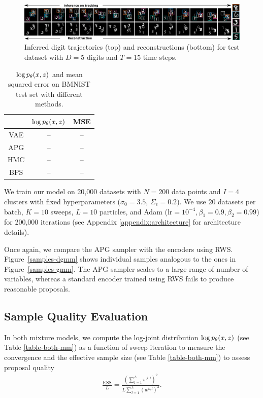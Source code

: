\documentclass{article}
\theoremstyle{definition}
\begin{document}
\begin{figure}[!h]
  \centering
  \includegraphics[width=1.0\textwidth]{figures/bmnist-5digits-samples.pdf}
  \caption{Inferred digit trajectories (top) and reconstructions (bottom) for test dataset with $D = 5$ digits and $T = 15$ time steps.}
  \label{mnist-qualitative}
\end{figure}
\begin{table}[t!]
    \centering
    \caption{$\log p_\theta (x, z)$ and mean squared error on BMNIST test set with different methods.}
    \begin{tabular}{ccc}
     
    \toprule
         & $\log p_\theta (x, z)$ & MSE \\
    \midrule
        VAE & -- & -- \\
        APG & -- & -- \\
        HMC & -- & -- \\
        BPS & -- & -- \\
    \bottomrule
    \end{tabular}   
\end{table}
We train our model on 20,000 datasets with $N = 200$ data points and $I = 4$ clusters with fixed hyperparameters ($\sigma_0 = 3.5$, $\Sigma_{\epsilon} = 0.2$). We use $20$ datasets per batch, $K=10$ sweeps, $L=10$ particles, and Adam ($\mathrm{lr} = 10^{-4}, \beta_1 = 0.9, \beta_2 = 0.99$) for 200,000 iterations (see Appendix \ref{appendix:architecture} for architecture details).

Once again, we compare the APG sampler with the encoders using RWS. Figure~\ref{samples-dgmm} shows individual samples analogous to the ones in Figure~\ref{samples-gmm}. The APG sampler scales to a large range of number of variables, whereas a standard encoder trained using RWS fails to produce reasonable proposals.

\subsection{Sample Quality Evaluation}
In both mixture models, we compute the log-joint distribution $\log p_\theta(x, z)$ (see Table \ref{table-both-mm}) as a function of sweep iteration to measure the convergence and the effective sample size (see Table \ref{table-both-mm}) to assess proposal quality
\begin{align}
\label{ess-eq}
    \frac{\text{ESS}}{L} 
    = 
    \frac{(\sum_{l=1}^L w^{k,l})^2}
         {L \sum_{l=1}^L (w^{k,l})^2}
    .
\end{align}
\end{document}
